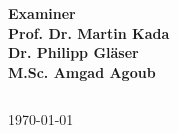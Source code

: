 \documentclass[11pt]{article}
\begin{document}
\begin{titlepage}
\begin{center}
	   	\vspace{1.6 cm}
	   	\textbf{Examiner}\\
	   		    	    \vspace{0.2 cm}
	   	\textbf{Prof. Dr. Martin Kada}\\
	   		    	    \vspace{0.2 cm}
	   	\textbf{Dr. Philipp Gl\"{a}ser}\\
	   		    	    \vspace{0.2 cm}
	   	\textbf{M.Sc. Amgad Agoub}\\
   	    
	\end{center}
	\begin{verbatim}
\end{verbatim}
\vspace{0.5 cm}
	\begin{center}
		\today
	\end{center}

\end{titlepage}

\newpage
\end{document}
